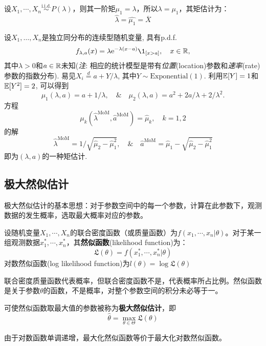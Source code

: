 \begin{example}[泊松分布的矩估计]\label{moment_estimate_Poisson}
    设$X_1, \cdots ,X_n \overset{\text{i.i.d.}}{\sim} P(\lambda)$，则其一阶矩$\mu_1=\lambda$，所以$\lambda=\mu_1$，其矩估计为：
    \[ \hat{\lambda} = \hat{\mu_1} = \overline{X} \]
\end{example}

\begin{example}
    设$X_1,\dots,X_n$是独立同分布的连续型随机变量, 具有p.d.f.
    \[ f_{\lambda,a}(x) = \lambda\mathrm{e}^{-\lambda(x-a)}\1_{[x>a]}, \quad x\in\R, \]
    其中$\lambda > 0$和$a \in \mathbb{R}$未知(\emph{注}: 相应的统计模型是带有\emph{位置}(location)参数和\emph{速率}(rate)参数的指数分布). 易见$X_i \stackrel{d}{=} a + Y/\lambda$, 其中$Y \sim \mathrm{Exponential}(1)$. 利用$\mathbb{E}[Y]=1$和$\mathbb{E}[Y^2] = 2$, 可以得到
    \[ \mu_1(\lambda,a) = a + 1/\lambda, \quad\&\quad
        \mu_2(\lambda,a) = a^2 + 2a/\lambda + 2/\lambda^2 . \]
    方程
    \[ \mu_{k}(\hat{\lambda}^{\mathrm{MoM}},\hat{a}^{\mathrm{MoM}}) = \hat{\mu}_{k}, \quad k = 1,2 \]
    的解
    \[ \hat{\lambda}^{\mathrm{MoM}} = 1\Big/\sqrt{\hat{\mu}_2-\hat{\mu}_1^2}, \quad\&\quad
        \hat{a}^{\mathrm{MoM}} = \hat{\mu}_1-\sqrt{\hat{\mu}_2-\hat{\mu}_1^2} \]
    即为$(\lambda,a)$的一种矩估计.
\end{example}

\subsection{极大然似估计}

极大然似估计的基本思想：对于参数空间中的每一个参数，计算在此参数下，观测数据的发生概率，选取最大概率对应的参数。

\begin{definition}[然似函数]
    设随机变量$X_1,\cdots ,X_n$的联合密度函数（或质量函数）为$f(x_1,\cdots ,x_n|\theta)$。对于某一组观测数据$x_1^* ,\cdots ,x_n^*$，其\textbf{然似函数}(likelihood function)为：
    \[ \mathfrak{L}(\theta) = f(x_1^* ,\cdots ,x_n^*|\theta) \]
    对数然似函数(log likelihood function)为$l(\theta)=\log\mathfrak{L}(\theta)$
\end{definition}
\begin{remark}
    联合密度质量函数代表概率，但联合密度函数不是，代表概率所占比例。然似函数是关于参数$\theta$的函数，不是概率，对整个参数空间的积分未必等于一。
\end{remark}

\begin{definition}[极大然似估计]
    可使然似函数取最大值的参数被称为\textbf{极大然似估计}，即
    \[ \hat{\theta}=\max_{\theta \in \Theta}\mathfrak{L}(\theta) \]
\end{definition}
\begin{remark}
    由于对数函数单调递增，最大化然似函数等价于最大化对数然似函数。
\end{remark}

